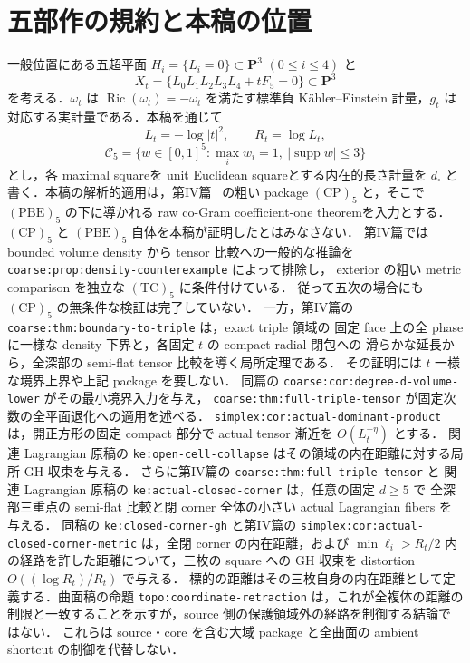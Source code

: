 \documentclass[a4paper,11pt]{ltjsarticle}
\numberwithin{equation}{section}
\theoremstyle{plain}
\theoremstyle{definition}
\theoremstyle{remark}
\begin{document}
\section*{五部作の規約と本稿の位置}
一般位置にある五超平面 $H_i=\{L_i=0\}\subset\mathbf P^3$ $(0\le i\le4)$ と
\[
 X_t=\{L_0L_1L_2L_3L_4+tF_5=0\}\subset\mathbf P^3
\]
を考える．$\omega_t$ は $\operatorname{Ric}(\omega_t)=-\omega_t$ を満たす標準負 Kähler--Einstein 計量，$g_t$ は対応する実計量である．本稿を通じて
\[
 L_t=-\log|t|^2,\qquad R_t=\log L_t,
\]
\[
 \mathcal C_5=\{w\in[0,1]^5:\max_iw_i=1,\ |\operatorname{supp}w|\le3\}
\]
とし，各 maximal squareを unit Euclidean squareとする内在的長さ計量を $d_\square$ と書く．本稿の解析的適用は，第IV篇~\cite{SeriesIV} の粗い package $\mathrm{(CP)}_5$ と，そこで $\mathrm{(PBE)}_5$ の下に導かれる raw co-Gram coefficient-one theoremを入力とする．$\mathrm{(CP)}_5$ と $\mathrm{(PBE)}_5$ 自体を本稿が証明したとはみなさない．
第IV篇では bounded volume density から tensor 比較への一般的な推論を
\texttt{coarse:prop:density-counterexample} によって排除し，
exterior の粗い metric comparison を独立な $\mathrm{(TC)}_5$ に条件付けている．
従って五次の場合にも $\mathrm{(CP)}_5$ の無条件な検証は完了していない．
一方，第IV篇の \texttt{coarse:thm:boundary-to-triple} は，exact triple 領域の
固定 face 上の全 phase に一様な density 下界と，各固定 $t$ の compact radial 閉包への
滑らかな延長から，全深部の semi-flat tensor 比較を導く局所定理である．
その証明には $t$ 一様な境界上界や上記 package を要しない．
同篇の \texttt{coarse:cor:degree-d-volume-lower} がその最小境界入力を与え，
\texttt{coarse:thm:full-triple-tensor} が固定次数の全平面退化への適用を述べる．
\texttt{simplex:cor:actual-dominant-product} は，開正方形の固定 compact 部分で
actual tensor 漸近を $O(L_t^{-\eta})$ とする．
関連 Lagrangian 原稿の \texttt{ke:open-cell-collapse} はその領域の内在距離に対する局所 GH 収束を与える．
さらに第IV篇の \texttt{coarse:thm:full-triple-tensor} と
関連 Lagrangian 原稿の \texttt{ke:actual-closed-corner} は，任意の固定 $d\ge5$ で
全深部三重点の semi-flat 比較と閉 corner 全体の小さい actual Lagrangian fibers を与える．
同稿の \texttt{ke:closed-corner-gh} と第IV篇の
\texttt{simplex:cor:actual-closed-corner-metric} は，全閉 corner の内在距離，および
$\min\ell_i>R_t/2$ 内の経路を許した距離について，三枚の square への
GH 収束を distortion $O((\log R_t)/R_t)$ で与える．
標的の距離はその三枚自身の内在距離として定義する．曲面稿の命題 \texttt{topo:coordinate-retraction} は，これが全複体の距離の制限と一致することを示すが，source 側の保護領域外の経路を制御する結論ではない．
これらは source・core を含む大域 package と全曲面の ambient shortcut の制御を代替しない．
\end{document}
